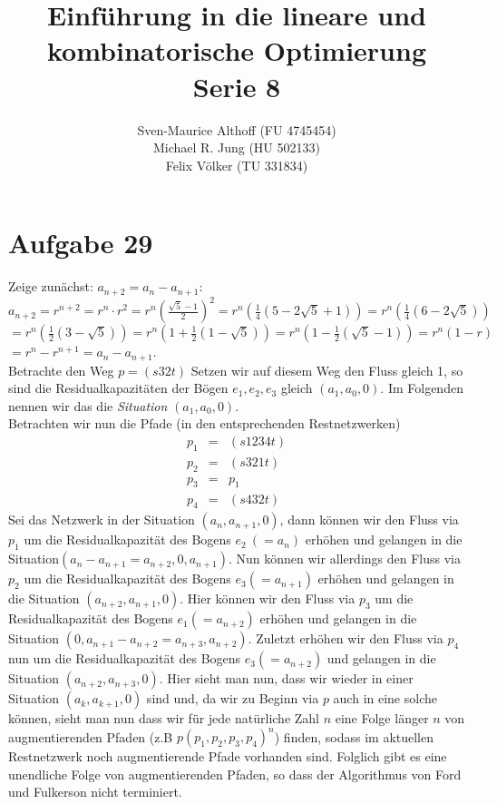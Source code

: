 \documentclass[a4paper,12pt,german]{scrartcl}
\title{Einführung in die lineare und kombinatorische Optimierung\\
Serie 8}
\author{Sven-Maurice Althoff (FU 4745454)\\Michael R. Jung (HU 502133)\\Felix Völker (TU 331834)}
\begin{document}
\maketitle

\section*{Aufgabe 29}
Zeige zunächst: $a_{n+2}=a_n-a_{n+1}$:\\
$a_{n+2}=r^{n+2}=r^n\cdot r^2= r^n\left(\frac{\sqrt5-1}2\right)^2 =r^n\left(\frac14(5-2\sqrt5+1)\right)=
r^n\left(\frac14(6-2\sqrt5)\right)$\\
$= r^n\left(\frac12(3-\sqrt5)\right)= r^n\left(1+\frac12(1-\sqrt5)\right)= r^n\left(1-\frac12(\sqrt5-1)\right) =r^n(1-r)$\\
$=r^n-r^{n+1}=a_n-a_{n+1}$.\\
Betrachte den Weg $p=(s32t)$ Setzen wir auf diesem Weg den Fluss gleich 1, so sind die Residualkapazitäten der Bögen $e_1,e_2,e_3$ gleich $(a_1,a_0,0)$. Im Folgenden nennen wir das die \emph{Situation} $(a_1,a_0,0)$.\\
Betrachten wir nun die Pfade (in den entsprechenden Restnetzwerken) 
$$\begin{array}{rcl}
p_1&=&(s1234t)\\
p_2&=&(s321t)\\
p_3&=&p_1\\
p_4&=&(s432t)
\end{array}$$
Sei das Netzwerk in der Situation $(a_n,a_{n+1},0)$, dann können wir den Fluss via $p_1$ um die Residualkapazität  des Bogens $e_2\ (=a_n)$ erhöhen und gelangen in die Situation\linebreak$(a_n-a_{n+1}=a_{n+2},0,a_{n+1})$. Nun können wir allerdings den Fluss via $p_2$ um die Residualkapazität  des Bogens $e_3 (=a_{n+1})$ erhöhen und gelangen in die Situation $(a_{n+2},a_{n+1},0)$. Hier können wir den Fluss via $p_3$ um die Residualkapazität  des Bogens $e_1 (=a_{n+2})$ erhöhen und gelangen in die Situation $(0,a_{n+1}-a_{n+2}=a_{n+3},a_{n+2})$. Zuletzt erhöhen wir den Fluss via $p_4$ nun um die Residualkapazität  des Bogens $e_3 (=a_{n+2})$ und gelangen in die Situation $(a_{n+2},a_{n+3},0)$. Hier sieht man nun, dass wir wieder in einer Situation $(a_{k},a_{k+1},0)$ sind und, da wir zu Beginn via $p$ auch in eine solche können, sieht man nun dass wir für jede natürliche Zahl $n$ eine Folge länger $n$ von augmentierenden Pfaden (z.B $p(p_1,p_2,p_3,p_4)^n$) finden, sodass im aktuellen Restnetzwerk noch augmentierende Pfade vorhanden sind. Folglich gibt es eine unendliche Folge von augmentierenden Pfaden, so dass der Algorithmus von Ford und Fulkerson nicht terminiert. 
\end{document}
